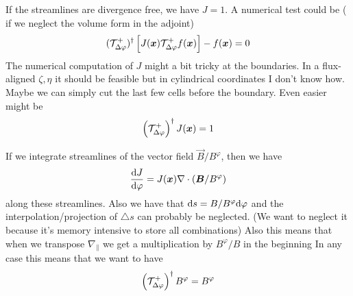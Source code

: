 If the streamlines are divergence free, we have $J=1$.
A numerical test could be ( if we neglect the volume form in the adjoint)
\begin{align}
    (\mathcal T^+_{\Delta\varphi})^\dagger \left[J({\boldsymbol{x}})\mathcal T^+_{\Delta\varphi} f({\boldsymbol{x}})\right] - f({\boldsymbol{x}}) = 0
    \label{}
\end{align}
The numerical computation of $J$ might a bit tricky at the boundaries. 
In a flux-aligned $\zeta, \eta$ it should be feasible but in cylindrical coordinates I don't know how. Maybe we can simply cut the last few cells before the boundary.
Even easier might be
\begin{align}
    \left(\mathcal T^+_{\Delta\varphi}\right)^\dagger J({\boldsymbol{x}} ) = 1
    \label{}
\end{align}

If we integrate streamlines of the vector field $\vec B/B^\varphi$, then we have
\begin{align}
    \frac{\mathrm{d} J}{\mathrm{d} \varphi} = J({\boldsymbol{x}} ) \nabla\cdot\left( {\boldsymbol{B}}/B^\varphi\right)
    \label{}
\end{align}
along these streamlines.
Also we have that $\mathrm{d} s = B/B^\varphi \mathrm{d} \varphi $ and the interpolation/projection of $\triangle s$ can probably be neglected. (We want to neglect it because it's memory intensive to store all combinations)
Also this means that when we transpose $\nabla_\parallel$ we get a
multiplication by $B^\varphi/B$ in the beginning
In any case this means that we want to have
\begin{align}
\left(\mathcal T^+_{\Delta\varphi}\right)^\dagger B^\varphi  =  B^\varphi
\end{align}


